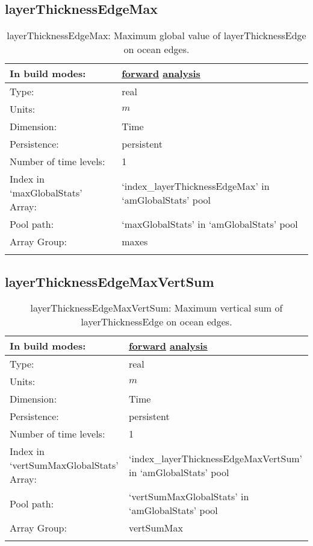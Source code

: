 \subsection[layerThicknessEdgeMax]{layerThicknessEdgeMax}
\label{subsec:var_sec_amGlobalStats_layerThicknessEdgeMax}
\begin{center}
\begin{longtable}{| p{2.0in} | p{4.0in} |}
        \hline 
        In build modes: & \hyperref[subsec:forward_var_tab_amGlobalStats]{forward} \hyperref[subsec:analysis_var_tab_amGlobalStats]{analysis} \\
        \hline 
        Type: & real \\
        \hline 
        Units: & $m$ \\
        \hline 
        Dimension: & Time \\
        \hline 
        Persistence: & persistent \\
        \hline 
        Number of time levels: & 1 \\
        \hline 
		 Index in `maxGlobalStats' Array: & `index\_layerThicknessEdgeMax' in `amGlobalStats' pool \\
		 \hline 
            Pool path: & `maxGlobalStats' in `amGlobalStats' pool \\
		 \hline 
		 Array Group: & maxes \\
		 \hline 
    \caption{layerThicknessEdgeMax: Maximum global value of layerThicknessEdge on ocean edges.}
\end{longtable}
\end{center}
\subsection[layerThicknessEdgeMaxVertSum]{layerThicknessEdgeMaxVertSum}
\label{subsec:var_sec_amGlobalStats_layerThicknessEdgeMaxVertSum}
\begin{center}
\begin{longtable}{| p{2.0in} | p{4.0in} |}
        \hline 
        In build modes: & \hyperref[subsec:forward_var_tab_amGlobalStats]{forward} \hyperref[subsec:analysis_var_tab_amGlobalStats]{analysis} \\
        \hline 
        Type: & real \\
        \hline 
        Units: & $m$ \\
        \hline 
        Dimension: & Time \\
        \hline 
        Persistence: & persistent \\
        \hline 
        Number of time levels: & 1 \\
        \hline 
		 Index in `vertSumMaxGlobalStats' Array: & `index\_layerThicknessEdgeMaxVertSum' in `amGlobalStats' pool \\
		 \hline 
            Pool path: & `vertSumMaxGlobalStats' in `amGlobalStats' pool \\
		 \hline 
		 Array Group: & vertSumMax \\
		 \hline 
    \caption{layerThicknessEdgeMaxVertSum: Maximum vertical sum of layerThicknessEdge on ocean edges.}
\end{longtable}
\end{center}
